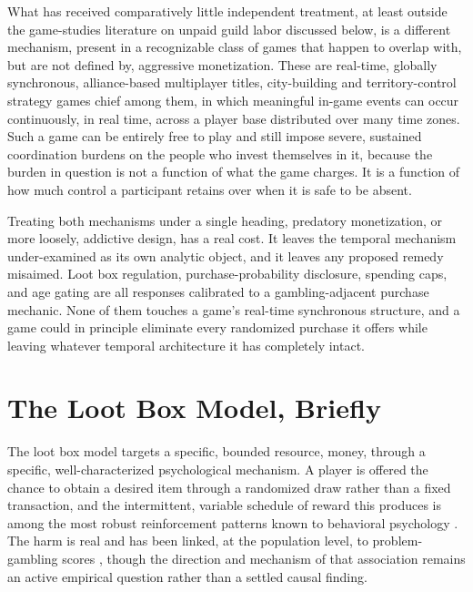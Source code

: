 \documentclass[11pt]{article}
\begin{document}
What has received comparatively little independent treatment, at least outside the game-studies literature on unpaid guild labor discussed below, is a different mechanism, present in a recognizable class of games that happen to overlap with, but are not defined by, aggressive monetization. These are real-time, globally synchronous, alliance-based multiplayer titles, city-building and territory-control strategy games chief among them, in which meaningful in-game events can occur continuously, in real time, across a player base distributed over many time zones. Such a game can be entirely free to play and still impose severe, sustained coordination burdens on the people who invest themselves in it, because the burden in question is not a function of what the game charges. It is a function of how much control a participant retains over when it is safe to be absent.

Treating both mechanisms under a single heading, predatory monetization, or more loosely, addictive design, has a real cost. It leaves the temporal mechanism under-examined as its own analytic object, and it leaves any proposed remedy misaimed. Loot box regulation, purchase-probability disclosure, spending caps, and age gating are all responses calibrated to a gambling-adjacent purchase mechanic. None of them touches a game's real-time synchronous structure, and a game could in principle eliminate every randomized purchase it offers while leaving whatever temporal architecture it has completely intact.

\section{The Loot Box Model, Briefly}

The loot box model targets a specific, bounded resource, money, through a specific, well-characterized psychological mechanism. A player is offered the chance to obtain a desired item through a randomized draw rather than a fixed transaction, and the intermittent, variable schedule of reward this produces is among the most robust reinforcement patterns known to behavioral psychology \cite{king2018}. The harm is real and has been linked, at the population level, to problem-gambling scores \cite{zendle2019}, though the direction and mechanism of that association remains an active empirical question rather than a settled causal finding.
\end{document}
